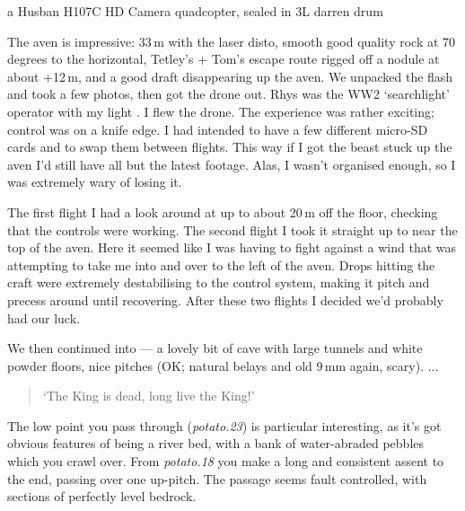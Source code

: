 \begin{marginfigure}
\checkoddpage \ifoddpage \forcerectofloat \else \forceversofloat \fi
\centering
 \caption{a Husban H107C HD Camera quadcopter, sealed in 3L darren drum }
 \label{quadcopter}
\end{marginfigure}

The aven is impressive: 33\,m with the laser disto, smooth good quality rock at 70 degrees to the horizontal, Tetley's + Tom's escape route rigged off a nodule at about +12\,m, and a good draft disappearing up the aven.
We unpacked the flash and took a few photos, then got the drone out. Rhys was the WW2 `searchlight' operator with my light . I flew the drone.
The experience was rather exciting; control was on a knife edge. I had intended to have a few different micro-SD cards and to swap them between flights. This way if I got the beast stuck up the aven I'd still have all but the latest footage. Alas, I wasn't organised enough, so I was extremely wary of losing it.

The first flight I had a look around at up to about 20\,m off the floor, checking that the controls were working. The second flight I took it straight up to near the top of the aven. Here it seemed like I was having to fight against a wind that was attempting to take me into and over to the left of the aven. Drops hitting the craft were extremely destabilising to the control system, making it pitch and precess around until recovering. After these two flights I decided we'd probably had our luck.

We then continued into  --- a lovely bit of cave with large tunnels and white powder floors, nice pitches (OK; natural belays and old 9\,mm again, scary). ...

\begin{quote}
`The King is dead, long live the King!'
\end{quote}

The low point you pass through (\textit{potato.23}) is particular interesting, as it's got obvious features of being a river bed, with a bank of water-abraded pebbles which you crawl over.
From \textit{potato.18} you make a long and consistent assent to the end, passing over one up-pitch. The passage seems fault controlled, with sections of perfectly level bedrock.

